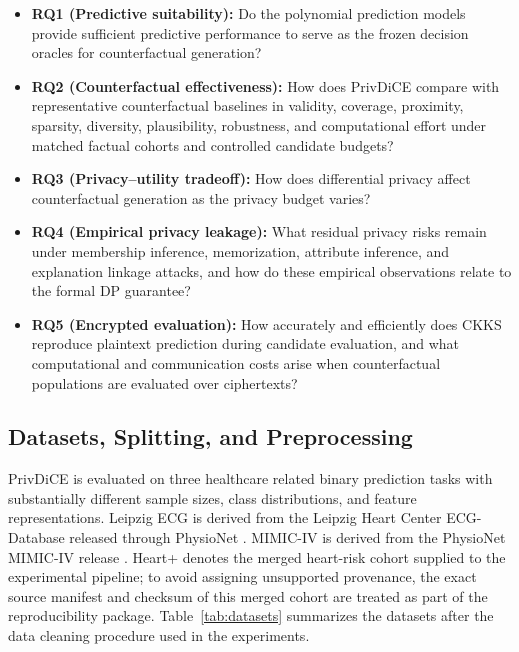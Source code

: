 \documentclass[preprint,12pt]{elsarticle}
\begin{document}
\begin{itemize}
    \item \textbf{RQ1 (Predictive suitability):}
    Do the polynomial prediction models provide sufficient predictive
    performance to serve as the frozen decision oracles for counterfactual
    generation?

    \item \textbf{RQ2 (Counterfactual effectiveness):}
    How does PrivDiCE compare with representative counterfactual baselines in
    validity, coverage, proximity, sparsity, diversity, plausibility,
    robustness, and computational effort under matched factual cohorts and
    controlled candidate budgets?

    \item \textbf{RQ3 (Privacy--utility tradeoff):}
    How does differential privacy affect counterfactual generation as the
    privacy budget varies?

    \item \textbf{RQ4 (Empirical privacy leakage):}
    What residual privacy risks remain under membership inference,
    memorization, attribute inference, and explanation linkage attacks, and how
    do these empirical observations relate to the formal DP guarantee?

    \item \textbf{RQ5 (Encrypted evaluation):}
    How accurately and efficiently does CKKS reproduce plaintext prediction
    during candidate evaluation, and what computational and communication costs
    arise when counterfactual populations are evaluated over ciphertexts?
\end{itemize}


\subsection{Datasets, Splitting, and Preprocessing}
\label{subsec:dataset}

PrivDiCE is evaluated on three healthcare related binary prediction tasks with
substantially different sample sizes, class distributions, and feature
representations. Leipzig ECG is derived from the Leipzig Heart Center
ECG-Database released through PhysioNet
\cite{PhysioNet-leipzig-heart-center-ecg-1.0.0}. MIMIC-IV is derived from the
PhysioNet MIMIC-IV release \cite{PhysioNet-mimiciv-2.2,johnson2023mimiciv}.
Heart+ denotes the merged heart-risk cohort supplied to the experimental
pipeline; to avoid assigning unsupported provenance, the exact source manifest
and checksum of this merged cohort are treated as part of the reproducibility
package. Table~\ref{tab:datasets} summarizes the datasets after the data
cleaning procedure used in the experiments.
\end{document}
